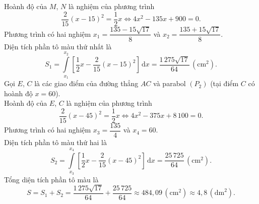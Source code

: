 \begin{ex}
{		Hoành độ của $M$, $N$ là nghiệm của phương trình
		\[\dfrac{2}{15}(x-15)^2 = \dfrac{1}{2}x \Leftrightarrow 4x^2 - 135x + 900 = 0.\]
		Phương trình có hai nghiệm $x_1 = \dfrac{135 - 15\sqrt{17}}{8}$ và $x_2 = \dfrac{135 + 15\sqrt{17}}{8}$.\\
		Diện tích phần tô màu thứ nhất là
		\[S_1 = \int\limits_{x_1}^{x_2} \left[\dfrac{1}{2}x - \dfrac{2}{15}(x-15)^2\right] \mathrm{\,d}x = \dfrac{1\,275\sqrt{17}}{64}\,\left(\text{cm}^2\right).\]
		Gọi $E$, $C$ là các giao điểm của đường thẳng $AC$ và parabol $(P_2)$ (tại điểm $C$ có hoành độ $x=60$). \\
		Hoành độ của $E$, $C$ là nghiệm của phương trình
		\[\dfrac{2}{15}(x-45)^2 = \dfrac{1}{2}x \Leftrightarrow 4x^2 - 375x + 8\,100 = 0.\]
		Phương trình có hai nghiệm $x_3 = \dfrac{135}{4}$ và $x_4 = 60$.\\
		Diện tích phần tô màu thứ hai là
		\[S_2 = \int\limits_{x_3}^{x_4} \left[\dfrac{1}{2}x - \dfrac{2}{15}(x-45)^2\right] \mathrm{\,d}x = \dfrac{25\,725}{64} \,\left(\text{cm}^2\right).\]
		Tổng diện tích phần tô màu là
		\[S = S_1 + S_2 = \dfrac{1\,275\sqrt{17}}{64} + \dfrac{25\,725}{64} \approx 484{,}09 \,\left(\text{cm}^2\right) \approx 4{,}8\,\left(\text{dm}^2\right).\]
	}
\end{ex}

